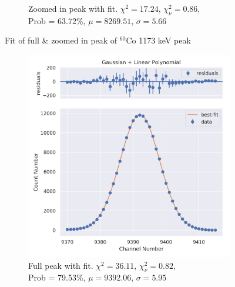 \documentclass[11pt,a4paper]{article}
\newcommand{\element}[2]{$^{#2}\textrm{#1}$}
\begin{document}
\begin{figure}[H]
\begin{subfigure}{.5\linewidth}
    \caption{Zoomed in peak with fit. $\chi^2 = 17.24$, $\chi^2_\nu = 0.86$, \\ Prob = 63.72\%, $\mu = 8269.51$, $\sigma = 5.66$}
  \end{subfigure}
  \caption{Fit of full \& zoomed in peak of \element{Co}{60} 1173 keV peak}
\end{figure}
\begin{figure}[H]
  \centering
  \begin{subfigure}{.5\linewidth}
    \centering
    \includegraphics[width=\linewidth]{./Images/Cobalt60/Linear/Linear_2_Full.png}
    \caption{Full peak with fit. $\chi^2 = 36.11$, $\chi^2_\nu = 0.82$, \\ Prob = 79.53\%, $\mu = 9392.06$, $\sigma = 5.95$}
  \end{subfigure}%
  \begin{subfigure}{.5\linewidth}
    \centering

\end{subfigure}
\end{figure}
\end{document}
